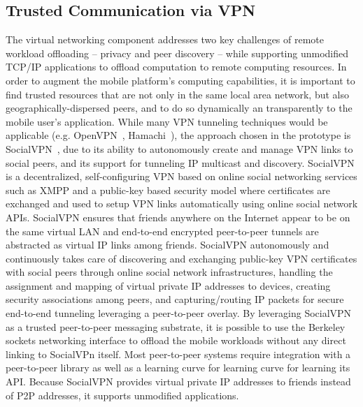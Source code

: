 \subsection{Trusted Communication via VPN}
%
\label{offloading:vpn}
The virtual networking component addresses two key challenges of remote
workload offloading -- privacy and peer discovery -- while supporting
unmodified TCP/IP applications to offload computation to remote
computing resources.
%
In order to augment the mobile platform's computing capabilities, it is
important to find trusted resources that are not only in the same local
area network, but also geographically-dispersed peers, and to do so
dynamically an transparently to the mobile user's application.
%
While many VPN tunneling techniques would be applicable (e.g.
OpenVPN~\cite{openvpn}, Hamachi~\cite{hamachi}), the approach chosen in
the prototype is SocialVPN~\cite{socialvpn}, due to its ability to
autonomously create and manage VPN links to social peers, and its
support for tunneling IP multicast and discovery.
%
SocialVPN is a decentralized, self-configuring VPN based on online
social networking services such as XMPP and a public-key based security
model where certificates are exchanged and used to setup VPN links
automatically using online social network APIs.
%
SocialVPN ensures that friends anywhere on the Internet appear to be on
the same virtual LAN and end-to-end encrypted peer-to-peer tunnels are
abstracted as virtual IP links among friends.
%
SocialVPN  autonomously and continuously takes care of discovering and
exchanging public-key VPN certificates with social peers through online
social network infrastructures, handling the assignment and mapping of
virtual private IP addresses to devices, creating security associations
among peers, and capturing/routing IP packets for secure end-to-end
tunneling leveraging a peer-to-peer overlay.
%
By leveraging SocialVPN as a trusted peer-to-peer messaging substrate,
it is possible to use the Berkeley sockets networking interface to
offload the mobile workloads without any direct linking to SocialVPn
itself.
%
Most peer-to-peer systems require integration with a peer-to-peer
library as well as a learning curve for learning curve for learning its
API.
%
Because SocialVPN provides virtual private IP addresses to friends
instead of P2P addresses, it supports unmodified applications.
%

